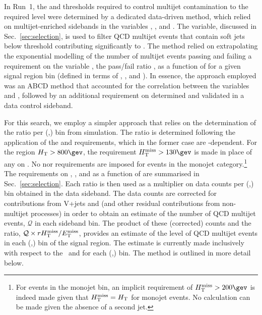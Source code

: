 In Run~1, the \alphat and \bdphi thresholds required to control
multijet contamination to the required level were determined by a
dedicated data-driven method, which relied on multijet-enriched
sidebands in the variables \alphat, \bdphi, and \mhtmet. The \mhtmet
variable, discussed in Sec.~\ref{sec:selection}, is used to filter QCD
multijet events that contain soft jets below threshold contributing
significantly to \mht. The method relied on extrapolating the
exponential modelling of the number of multijet events passing and
failing a requirement on the variable \mhtmet, \ie the pass/fail ratio
\rmhtmet, as a function of \alphat for a given signal region bin
(defined in terms of \njet, \nb, and \scalht). In essence, the
approach employed was an ABCD method that accounted for the
correlation between the variables \rmhtmet and \alphat, followed
by an additional requirement on \bdphi determined and validated in a
data control sideband.

For this search, we employ a simpler approach that relies on the
determination of the ratio \rmhtmet per (\njet,\scalht) bin from
simulation. The ratio is determined following the application of the
\alphat and \bdphi requirements, which in the former case are
\scalht-dependent. For the region $\scalht > 800\gev$, the requirement
$\mht > 130\gev$ is made in place of any on \alphat. No \alphat nor
\mht requirements are imposed for events in the monojet
category.\footnote{For events in the monojet bin, an implicit
  requirement of $\mht > 200\gev$ is indeed made given that $\mbox{$H_{\rm T}^{\rm miss}$} =
  \mbox{$H_\text{T}$}$ for monojet events. No \alphat calculation can be made
  given the absence of a second jet.} The requirements on \alphat,
\mht, and \bdphi as a function of \scalht are summarised in
Sec.~\ref{sec:selection}. Each ratio \rmhtmet is then used as a
multiplier on data counts per (\bjet,\scalht) bin obtained in the
\mhtmet data sideband. The data counts are corrected for contributions
from V+jets and \ttbar (and other residual contributions from
non-multijet processes) in order to obtain an estimate of the number
of QCD multijet events, $\mathcal{Q}$ in each sideband bin. The
product of these (corrected) counts and the ratio, $\mathcal{Q} \times
r\mbox{$\mbox{$H_{\rm T}^{\rm miss}$} / \mbox{$E_\text{T}^{\rm miss}$}$}$, provides an estimate of the level of QCD multijet events in
each (\njet,\scalht) bin of the signal region. The estimate is
currently made inclusively with respect to the \nb\ and \mht for each
(\njet,\scalht) bin. The method is outlined in more detail below.

